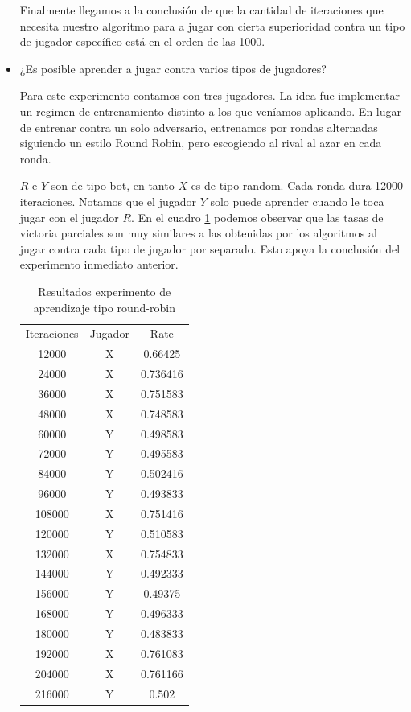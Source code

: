 \documentclass[10pt,a4paper]{article}
\begin{document}
\begin{itemize}
Finalmente llegamos a la conclusión de que la cantidad de iteraciones que necesita nuestro algoritmo para a jugar con cierta superioridad contra un tipo de jugador específico está en el orden de las 1000.

\item ¿Es posible aprender a jugar contra varios tipos de jugadores?

Para este experimento contamos con tres jugadores. La idea fue implementar un regimen de entrenamiento distinto a los que veníamos aplicando. En lugar de entrenar contra un solo adversario, entrenamos por rondas alternadas siguiendo un estilo Round Robin, pero escogiendo al rival al azar en cada ronda. 

$R$ e $Y$ son de tipo bot, en tanto $X$ es de tipo random. Cada ronda dura 12000 iteraciones. Notamos que el jugador $Y$ solo puede aprender cuando le toca jugar con el jugador $R$. En el cuadro \ref{tab:4}
podemos observar que las tasas de victoria parciales son muy similares a las obtenidas por los algoritmos al jugar contra cada tipo de jugador por separado. Esto apoya la conclusión del experimento inmediato anterior.

	\begin{table}[H]
    \centering
	\begin{tabular}{c c c}
      Iteraciones & Jugador & Rate\\
			12000 & X & 0.66425\\
24000 & X & 0.736416\\
36000 & X & 0.751583\\
48000 & X & 0.748583\\
60000 & Y & 0.498583\\
72000 & Y & 0.495583\\
84000 & Y & 0.502416\\ 
96000 & Y & 0.493833\\
108000 & X & 0.751416\\
120000 & Y & 0.510583\\
132000 & X & 0.754833\\
144000 & Y & 0.492333\\
156000 & Y & 0.49375\\
168000 & Y & 0.496333\\
180000 & Y & 0.483833\\
192000 & X & 0.761083\\
204000 & X & 0.761166\\
216000 & Y & 0.502\\
	\end{tabular}
	\caption{Resultados experimento de aprendizaje tipo round-robin}
    \label{tab:4}
	\end{table}


\end{itemize}
\end{document}
